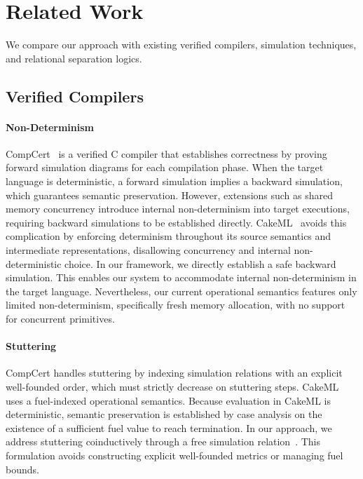 \documentclass[report.tex]{subfiles}
\begin{document}
\section{Related Work}
\label{sec:related-work}

We compare our approach with existing verified compilers,
simulation techniques,
and relational separation logics.

\subsection{Verified Compilers}
\label{sec:related-compilers}

\paragraph{Non-Determinism}
CompCert~\parencite{leroy-09-compcert} is a verified C compiler
that establishes correctness by proving forward simulation diagrams
for each compilation phase.
When the target language is deterministic,
a forward simulation implies a backward simulation,
which guarantees semantic preservation.
However,
extensions such as shared memory concurrency
introduce internal non-determinism into target executions,
requiring backward simulations to be established directly.
CakeML~\parencite{kumar-14-cakeml,tan-19-cakeml} avoids this complication
by enforcing determinism throughout its source semantics
and intermediate representations,
disallowing concurrency and internal non-deterministic choice.
In our framework,
we directly establish a safe backward simulation.
This enables our system to accommodate internal non-determinism
in the target language.
Nevertheless,
our current \muRTL{} operational semantics
features only limited non-determinism,
specifically fresh memory allocation,
with no support for concurrent primitives.

\paragraph{Stuttering}
CompCert handles stuttering by indexing simulation relations
with an explicit well-founded order,
which must strictly decrease on stuttering steps.
CakeML uses a fuel-indexed operational semantics.
Because evaluation in CakeML is deterministic,
semantic preservation is established by case analysis
on the existence of a sufficient fuel value to reach termination.
In our approach,
we address stuttering coinductively through
a free simulation relation~\parencite{cho-23-stuttering}.
This formulation avoids constructing explicit well-founded metrics
or managing fuel bounds.
\end{document}
